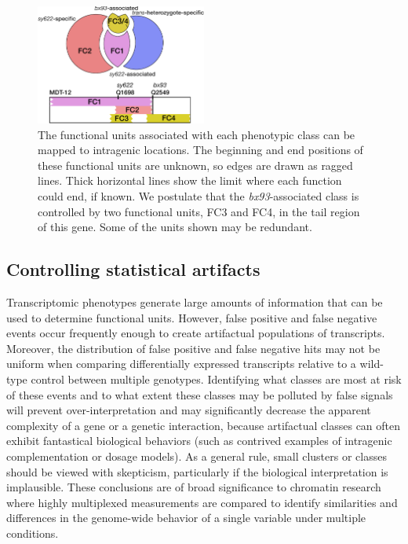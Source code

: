 \documentclass[10pt, twocolumn]{article}
\begin{document}
\begin{figure}
  \centering{}
  \includegraphics[width=0.5\textwidth]{../figs/inferred_domains.pdf}
  \caption{
    The functional units associated with each phenotypic class can be
    mapped to intragenic locations. The beginning and end positions of
    these functional units are unknown,
    so edges are drawn as ragged lines. Thick horizontal lines show the
    limit where each function could end, if known. We postulate that the
    \emph{bx93}-associated class is controlled by two functional units, FC3 and
    FC4, in the tail region of this gene. Some of the units shown may be
    redundant.
  }
\label{fig:domains}
\end{figure}

\subsection*{Controlling statistical artifacts}
Transcriptomic phenotypes generate large amounts of information that can be used
to determine functional units. However, false positive and false negative events
occur frequently enough to create artifactual populations of transcripts.
Moreover, the distribution of false positive and false negative hits may not be
uniform when comparing differentially expressed transcripts relative to a
wild-type control between multiple genotypes. Identifying what classes are most
at risk of these events and to what extent these classes may be polluted by
false signals will prevent over-interpretation and
may significantly decrease the apparent complexity of
a gene or a genetic interaction, because artifactual classes can often exhibit
fantastical biological behaviors (such as contrived examples of intragenic
complementation or dosage models). As a general rule, small clusters or classes
should be viewed with skepticism, particularly if the biological interpretation
is implausible. These conclusions are of broad significance to chromatin
research where highly multiplexed measurements are compared to identify
similarities and differences in the genome-wide behavior of a single variable
under multiple conditions.
\end{document}
